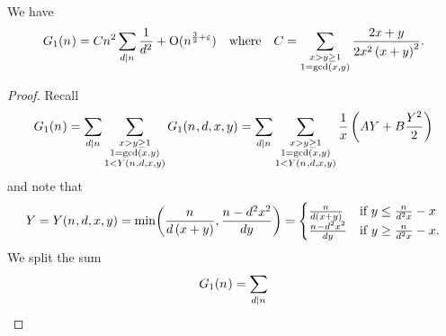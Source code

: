   \begin{lemma}\label{lemma.g-one}
    We have
    \begin{equation}\label{eq.const-c}
      \TheQuantityOf[1]{\Size}
      =
      \TheZetaConst
      \Size^2
      \Sum[\TheDivisor\divides\Size]{
        \frac{1}{\TheDivisor^2}
      }
      +
      \BigO{\Size^{\frac32 + \TheEpsilon}}
   \quad   \text{where} \quad 
       \TheZetaConst
      =
      \Sum[\substack{
        \LeftA>\RightA\geq 1 \\
        1 = \gcdOf{\LeftA,\RightA} \\
      }]{
        \frac{
          2\LeftA+\RightA
        }{
          2\LeftA^2\Parens{\LeftA+\RightA}^2
        }
      }
      .
    \end{equation}
  \end{lemma}
  \begin{proof}
    Recall
    \[
      \TheQuantityOf[1]{\Size}
      =
      \Sum[\TheDivisor\divides\Size]{
        \Sum[\substack{
          \LeftA>\RightA\geq 1 \\
          1 = \gcdOf{\LeftA,\RightA} \\
          1 < \UpperBoundOf{\Size,\TheDivisor,\LeftA,\RightA}
        }]{
          \TheQuantityOf[1]{\Size,\TheDivisor,\LeftA,\RightA}
        }
      }
      =
      \Sum[\TheDivisor\divides\Size]{
        \Sum[\substack{
          \LeftA>\RightA\geq 1 \\
          1 = \gcdOf{\LeftA,\RightA} \\
          1 < \UpperBoundOf{\Size,\TheDivisor,\LeftA,\RightA}
        }]{
          \frac{1}{\LeftA}\Parens{\ConstantTerm\UpperBound+\LinearTerm\frac{\UpperBound^2}{2}}
        }
      }
    \]
    and note that
    \[
    \UpperBound  =    \UpperBoundOf{\Size,\TheDivisor,\LeftA,\RightA}
      =
      \MinOf{
        \frac{\Size}{\TheDivisor\Parens{\LeftA+\RightA}}
        ,
        \frac{\Size-\TheDivisor^2\LeftA^2}{\TheDivisor\RightA}
      }
      =
      \begin{cases}
        \frac{\Size}{\TheDivisor\Parens{\LeftA+\RightA}}
        &
          \text{if\ }
          \RightA \leq \frac{\Size}{\TheDivisor^2\LeftA} - \LeftA
        \\
        \frac{\Size-\TheDivisor^2\LeftA^2}{\TheDivisor\RightA}
        &
            \text{if\ }
          \RightA \geq \frac{\Size}{\TheDivisor^2\LeftA} - \LeftA
          .
      \end{cases}
    \]
    We split the sum
    \[
      \TheQuantityOf[1]{\Size}
      =
      \Sum[\TheDivisor\divides\Size]{
}\]
\end{proof}
